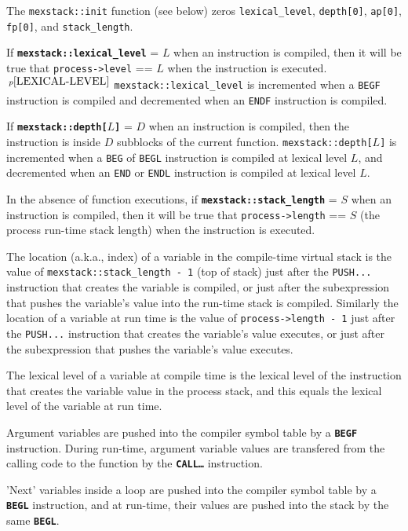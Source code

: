 \documentclass[12pt]{article}
\newcommand{\TT}[1]{{\tt \bfseries #1}}
\newcommand{\pagnote}[1]{$\,^{p\pageref{#1}}$}
\newcommand{\EOL}{\penalty \exhyphenpenalty}
\newenvironment{indpar}[1][0.3in]%
	{\begin{list}{}%
		     {\setlength{\itemsep}{0in}%
		      \setlength{\topsep}{0in}%
		      \setlength{\parsep}{1ex}%
		      \setlength{\labelwidth}{#1}%
		      \setlength{\leftmargin}{#1}%
		      \addtolength{\leftmargin}{\labelsep}}%
	 \item}%
	{\end{list}}
\begin{document}
\begin{indpar}
The {\tt mexstack::init} function (see below) zeros {\tt lexical\_level},
{\tt depth[0]}, {\tt ap[0]}, {\tt fp[0]}, and {\tt stack\_length}.

If \TT{mexstack::lexical\_level} = $L$
when an instruction is compiled,
then it will be true that {\tt process->level} == $L$ when the instruction
is executed.\pagnote{LEXICAL-LEVEL}
{\tt mexstack::\EOL lexical\_\EOL level} is incremented when a {\tt BEGF}
instruction is compiled and decremented when an {\tt ENDF}
instruction is compiled.

If \TT{mexstack::depth[$L$]} = $D$\label{DEPTH}
when an instruction is compiled,
then the instruction is inside $D$ subblocks of the current function.
{\tt mexstack::depth[$L$]} is incremented when a {\tt BEG} of {\tt BEGL}
instruction is compiled at lexical level $L$, and decremented when
an {\tt END} or {\tt ENDL} instruction is compiled at lexical level $L$.

In the absence of function executions, if
\TT{mexstack::stack\_length} = $S$\label{STACK-LENGTH}
when an instruction is compiled,
then it will be true that {\tt process->length} == $S$ (the process run-time
stack length) when the instruction is executed.

The location (a.k.a., index) of a variable in the compile-time virtual stack
is the value of
{\tt mexstack::\EOL stack\_\EOL length - 1} (top of stack)
just after the {\tt PUSH...}
instruction that creates the variable is compiled, or just after
the subexpression that pushes the variable's value into the run-time
stack is compiled.
Similarly the location of a variable at run time is the value of
{\tt process->length - 1} just after the {\tt PUSH...}
instruction that creates the variable's value executes, or just after
the subexpression that pushes the variable's value executes.

The lexical level of a variable at compile time is the lexical
level of the instruction that creates the variable value in
the process stack, and this equals the lexical level of the variable
at run time.

Argument variables are pushed into
the compiler symbol table by a \TT{BEGF} instruction.
During run-time, argument variable values are transfered from the
calling code to the function by the \TT{CALL\ldots} instruction.

'Next' variables inside a loop are pushed into the compiler symbol
table by a \TT{BEGL} instruction, and at run-time, their values are
pushed into the stack by the same \TT{BEGL}.


\end{indpar}
\end{document}
